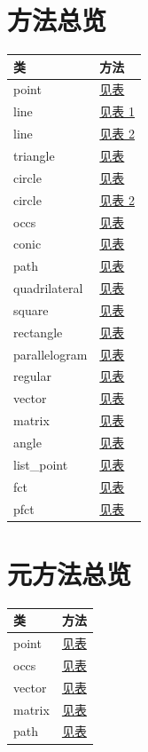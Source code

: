 \documentclass[
  DIV=16,
  fontsize=10,
  index=totoc,
  twoside,
  cadre,
  headings=small
]{tkz-doc-elements}
\begin{document}
\section*{方法总览}
\begin{tabular}{ll}
\textbf{类} & \textbf{方法} \\
\hline
point         & \hyperref[point:methods]{见表}         \\
line          & \hyperref[line:methods part 1]{见表 1} \\
line          & \hyperref[line:methods part 2]{见表 2} \\
triangle      & \hyperref[triangle:methods]{见表}      \\
circle        & \hyperref[circle:methods]{见表}        \\
circle        & \hyperref[circle:methods 2]{见表 2}    \\
occs          & \hyperref[occs:methods]{见表}          \\
conic         & \hyperref[conic:methods]{见表}         \\
path          & \hyperref[path:methods]{见表}          \\
quadrilateral & \hyperref[quadrilateral:methods]{见表} \\
square        & \hyperref[square:methods]{见表}        \\
rectangle     & \hyperref[rectangle:methods]{见表}     \\
parallelogram & \hyperref[parallelogram:methods]{见表} \\
regular       & \hyperref[regular:methods]{见表}       \\
vector        & \hyperref[vector:methods]{见表}        \\
matrix        & \hyperref[matrix:methods]{见表}        \\
angle         & \hyperref[angle:methods]{见表}         \\
list\_point   & \hyperref[list_point:methods]{见表}    \\
fct           & \hyperref[fct:methods]{见表}           \\
pfct          & \hyperref[pfct:methods]{见表}          \\
\end{tabular}
\section*{元方法总览}
\begin{tabular}{ll}
\textbf{类} & \textbf{方法} \\
\hline
point  & \hyperref[point:methods]{见表}  \\
occs   & \hyperref[occs:methods]{见表}   \\
vector & \hyperref[vector:methods]{见表} \\
matrix & \hyperref[matrix:methods]{见表} \\
path   & \hyperref[path:methods]{见表}   \\
\end{tabular}
\clearpage
\tableofcontents
\end{document}
